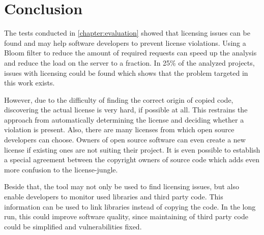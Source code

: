 
\chapter{Conclusion}\label{chapter:conclusion}
The tests conducted in \autoref{chapter:evaluation} showed that licensing issues can be found and may help software developers to prevent license violations.
Using a Bloom filter to reduce the amount of required requests can speed up the analysis and reduce the load on the server to a fraction.
In 25\% of the analyzed projects, issues with licensing could be found which shows that the problem targeted in this work exists.

However, due to the difficulty of finding the correct origin of copied code, discovering the actual license is very hard, if possible at all.
This restrains the approach from automatically determining the license and deciding whether a violation is present.
Also, there are many licenses from which open source developers can choose.
Owners of open source software can even create a new license if existing ones are not suiting their project.
It is even possible to establish a special agreement between the copyright owners of source code which adds even more confusion to the license-jungle.

Beside that, the tool may not only be used to find licensing issues, but also enable developers to monitor used libraries and third party code.
This information can be used to link libraries instead of copying the code.
In the long run, this could improve software quality, since maintaining of third party code could be simplified and vulnerabilities fixed.
